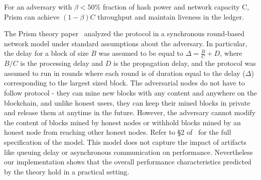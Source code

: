 \begin{theorem}
\label{thm:throughput} For an adversary with $\beta < 50\%$ fraction of hash power and network capacity C, Prism can achieve  $(1-\beta)C$ throughput and maintain liveness in the ledger.
\end{theorem}


\smallskip
{} The Prism theory paper~\cite{prism-theory} analyzed the protocol in a synchronous round-based network model under standard assumptions about the adversary. In particular, the delay for a block of size $B$ was assumed to be equal to $\Delta = \frac{B}{C}+D$, where $B/C$ is the processing delay and $D$ is the propagation delay, and the protocol was assumed to run in rounds where each round is of duration equal to the delay ($\Delta$) corresponding to the largest sized block. The adversarial nodes do not have to follow protocol - they can mine new blocks with any content and anywhere on the blockchain, and  unlike honest users, they can keep their mined blocks in private and release them at anytime in the future. However, the adversary cannot modify the content of blocks mined by honest nodes or withhold blocks mined by an honest node from reaching other honest nodes. Refer to \S2 of~\cite{prism-theory} for the full specification of the model. This model does not capture the impact of artifacts like queuing delay or asynchronous communication on performance. Nevertheless our implementation shows that the overall performance characteristics predicted by the theory hold in a practical setting. 







